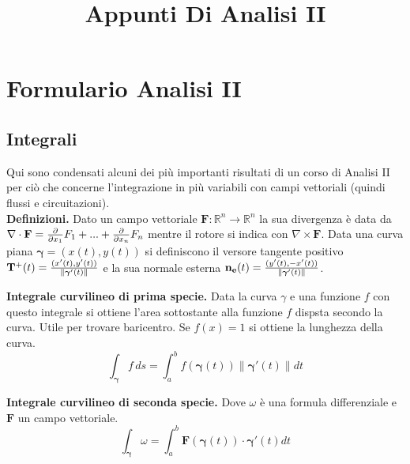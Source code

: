 \documentclass[a4paper,portrait,12pt]{article}
\theoremstyle{definition}
\begin{document}
\title{Appunti Di Analisi II}

\maketitle
\date
\newpage

\tableofcontents
\newpage

\section{Formulario Analisi II}

\subsection{Integrali}

Qui sono condensati alcuni dei più importanti risultati di un corso di Analisi II per ciò che concerne 
l'integrazione in più variabili con campi vettoriali (quindi flussi e circuitazioni).\\

\textbf{Definizioni.} Dato un campo vettoriale $\mathbf{F} : \mathbb{R}^n \to \mathbb{R}^n$ la sua divergenza 
è data da $\nabla \cdot \mathbf{F} = {\partial \over \partial x_1}F_1 + ... + {\partial \over \partial x_n}F_n$
mentre il rotore si indica con $\nabla\times\mathbf{F}$. Data una curva piana 
$\boldsymbol{\gamma} = (x(t),y(t))$ si definiscono il versore tangente positivo $\mathbf{T^+}(t) = 
{(x'(t),y'(t)) \over \left\|\boldsymbol{\gamma}'(t)\right\|}$ e la sua normale esterna $\mathbf{n_e}(t) = 
{(y'(t),-x'(t)) \over \left\| \boldsymbol{\gamma}'(t)\right\|}$.
\bigskip

\textbf{Integrale curvilineo di prima specie.} Data la curva $\gamma$ e una funzione $f$ con questo 
integrale si ottiene l'area sottostante alla funzione $f$ dispsta secondo la curva. Utile per trovare 
baricentro. Se $f(x) = 1$ si ottiene la lunghezza della curva.
\begin{equation}
\int_{\boldsymbol{\gamma}}f\,ds = \int_a^bf(\boldsymbol{\gamma}(t))\left\|\boldsymbol{\gamma}'(t)\right\|dt
\end{equation}

\textbf{Integrale curvilineo di seconda specie.} Dove $\omega$ è una formula differenziale e $ \mathbf{F}$ 
un campo vettoriale.
\begin{equation}
\int_{\boldsymbol{\gamma}}\omega = \int_a^b\mathbf{F}(\mathbf{\gamma}(t))\cdot\boldsymbol{\gamma}'(t)dt
\end{equation}
\end{document}
